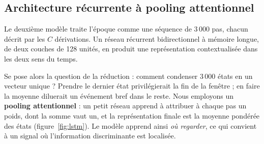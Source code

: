 \subsection{Architecture récurrente à pooling attentionnel}

Le deuxième modèle traite l'époque comme une séquence de 3\,000 pas, chacun décrit par
les $C$ dérivations. Un réseau récurrent bidirectionnel à mémoire longue, de deux
couches de 128 unités, en produit une représentation contextualisée dans les deux sens
du temps.

Se pose alors la question de la réduction : comment condenser 3\,000 états en un
vecteur unique ? Prendre le dernier état privilégierait la fin de la fenêtre ; en
faire la moyenne diluerait un événement bref dans le reste. Nous employons un
\textbf{pooling attentionnel} : un petit réseau apprend à attribuer à chaque pas un
poids, dont la somme vaut un, et la représentation finale est la moyenne pondérée des
états (figure~\ref{fig:lstm}). Le modèle apprend ainsi \emph{où regarder}, ce qui
convient à un signal où l'information discriminante est localisée.

